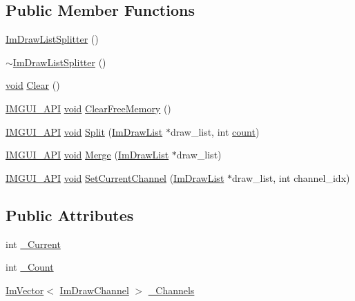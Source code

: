 \subsection*{Public Member Functions}
\begin{DoxyCompactItemize}
\item 
\hyperlink{structImDrawListSplitter_a2f832d1adedde7663c991af366847c75}{Im\+Draw\+List\+Splitter} ()
\item 
\hyperlink{structImDrawListSplitter_a712b8ba85de1e4095db67a86a3b80e21}{$\sim$\+Im\+Draw\+List\+Splitter} ()
\item 
\hyperlink{imgui__impl__opengl3__loader_8h_ac668e7cffd9e2e9cfee428b9b2f34fa7}{void} \hyperlink{structImDrawListSplitter_ac6865e5a2f180419fa282b681bf08c9c}{Clear} ()
\item 
\hyperlink{imgui_8h_a43829975e84e45d1149597467a14bbf5}{I\+M\+G\+U\+I\+\_\+\+A\+PI} \hyperlink{imgui__impl__opengl3__loader_8h_ac668e7cffd9e2e9cfee428b9b2f34fa7}{void} \hyperlink{structImDrawListSplitter_a95dbdaa7ea2a0328a85732ed210a549b}{Clear\+Free\+Memory} ()
\item 
\hyperlink{imgui_8h_a43829975e84e45d1149597467a14bbf5}{I\+M\+G\+U\+I\+\_\+\+A\+PI} \hyperlink{imgui__impl__opengl3__loader_8h_ac668e7cffd9e2e9cfee428b9b2f34fa7}{void} \hyperlink{structImDrawListSplitter_aa491c5b1e10b2f5340e7db4949d31255}{Split} (\hyperlink{structImDrawList}{Im\+Draw\+List} $\ast$draw\+\_\+list, int \hyperlink{imgui__impl__opengl3__loader_8h_a619bc20e8198de3bd3f3d7fc34de66b2}{count})
\item 
\hyperlink{imgui_8h_a43829975e84e45d1149597467a14bbf5}{I\+M\+G\+U\+I\+\_\+\+A\+PI} \hyperlink{imgui__impl__opengl3__loader_8h_ac668e7cffd9e2e9cfee428b9b2f34fa7}{void} \hyperlink{structImDrawListSplitter_af3fc4bad2abca9e481d476d1877ba5be}{Merge} (\hyperlink{structImDrawList}{Im\+Draw\+List} $\ast$draw\+\_\+list)
\item 
\hyperlink{imgui_8h_a43829975e84e45d1149597467a14bbf5}{I\+M\+G\+U\+I\+\_\+\+A\+PI} \hyperlink{imgui__impl__opengl3__loader_8h_ac668e7cffd9e2e9cfee428b9b2f34fa7}{void} \hyperlink{structImDrawListSplitter_ad3797b0755caa07f3d69a9e3566eb0e5}{Set\+Current\+Channel} (\hyperlink{structImDrawList}{Im\+Draw\+List} $\ast$draw\+\_\+list, int channel\+\_\+idx)
\end{DoxyCompactItemize}
\subsection*{Public Attributes}
\begin{DoxyCompactItemize}
\item 
int \hyperlink{structImDrawListSplitter_a99a46d62e09810f31d0a6efd4a0d2b09}{\+\_\+\+Current}
\item 
int \hyperlink{structImDrawListSplitter_ae3a1593ee05bc52e6284943eab3c97a2}{\+\_\+\+Count}
\item 
\hyperlink{structImVector}{Im\+Vector}$<$ \hyperlink{structImDrawChannel}{Im\+Draw\+Channel} $>$ \hyperlink{structImDrawListSplitter_ab3b0bdddacaa7b347c41735c2d9952dc}{\+\_\+\+Channels}
\end{DoxyCompactItemize}


